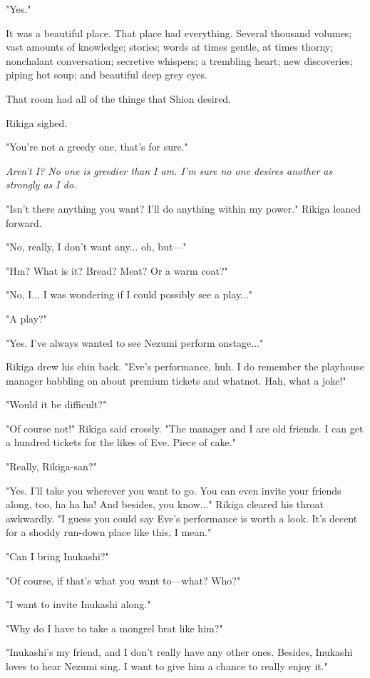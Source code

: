 "Yes."

It was a beautiful place. That place had everything. Several thousand volumes; vast amounts of knowledge; stories; words at times gentle, at times thorny; nonchalant conversation; secretive whispers; a trembling heart; new discoveries; piping hot soup; and beautiful deep grey eyes.

That room had all of the things that Shion desired.

Rikiga sighed.

"You're not a greedy one, that's for sure."

\emph{Aren't I? No one is greedier than I am. I'm sure no one desires another as strongly as I do.}

"Isn't there anything you want? I'll do anything within my power." Rikiga leaned forward.

"No, really, I don't want any... oh, but---"

"Hm? What is it? Bread? Meat? Or a warm coat?"

"No, I... I was wondering if I could possibly see a play..."

"A play?"

"Yes. I've always wanted to see Nezumi perform onstage..."

Rikiga drew his chin back. "Eve's performance, huh. I do remember the playhouse manager babbling on about premium tickets and whatnot. Hah, what a joke!"

"Would it be difficult?"

"Of course not!" Rikiga said crossly. "The manager and I are old friends. I can get a hundred tickets for the likes of Eve. Piece of cake."

"Really, Rikiga-san?"

"Yes. I'll take you wherever you want to go. You can even invite your friends along, too, ha ha ha! And besides, you know..." Rikiga cleared his throat awkwardly. "I guess you could say Eve's performance is worth a look. It's decent for a shoddy run-down place like this, I mean."

"Can I bring Inukashi?"

"Of course, if that's what you want to---what? Who?"

"I want to invite Inukashi along."

"Why do I have to take a mongrel brat like him?"

"Inukashi's my friend, and I don't really have any other ones. Besides, Inukashi loves to hear Nezumi sing. I want to give him a chance to really enjoy it."

